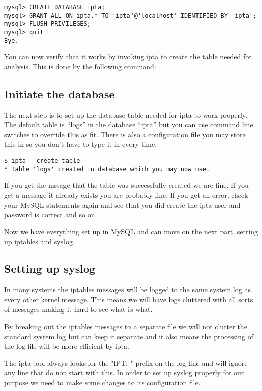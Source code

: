 \documentclass[english,twoside,openright,a4paper,12pt]{article}
\begin{document}
\small
\begin{verbatim}
mysql> CREATE DATABASE ipta;
mysql> GRANT ALL ON ipta.* TO 'ipta'@'localhost' IDENTIFIED BY 'ipta';
mysql> FLUSH PRIVILEGES;
mysql> quit
Bye.
\end{verbatim}
\normalsize

You can now verify that it works by invoking ipta to create the table 
needed for analysis. This is done by the following command:

\subsection{Initiate the database}

The next step is to set up the database table needed for ipta to work
properly. The default table is ``logs'' in the database ``ipta'' but
you can use command line switches to override this as fit. There is
also a configuration file you may store this in so you don't have to
type it in every time.

\begin{verbatim}
$ ipta --create-table
* Table 'logs' created in database which you may now use.
\end{verbatim}

If you get the mssage that the table was successfully created we are
fine. If you get a message it already exists you are probably fine. If
you get an error, check your MySQL statements again and see that you
did create the ipta user and password is correct and so on.

Now we have everything set up in MySQL and can move on the next part,
setting up iptables and syslog.

\subsection{Setting up syslog}

In many systems the iptables messages will be logged to the same
system log as every other kernel message. This means we will have logs
cluttered with all sorts of messages making it hard to see what is
what.

By breaking out the iptables messages to a separate file we will not
clutter the standard system log but can keep it separate and it also
means the processing of the log file will be more efficient by ipta.

The ipta tool always looks for the "IPT: " prefix on the log line
and will ignore any line that do not start with this. In order to set
up syslog properly for our purpose we need to make some changes to its
configuration file.
\end{document}
